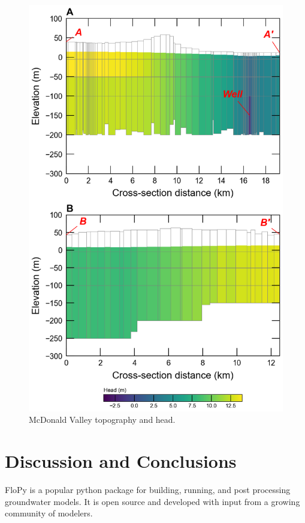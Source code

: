 \documentclass[11pt, oneside]{article}   	%
\begin{document}
\lipsum[2-4]

\begin{figure}[ht!]
	\begin{center}
		\includegraphics{figures/mv_voronoi_xsection.png}
	\end{center}
	\caption{McDonald Valley topography and head.}
	\label{fig:mvxsection}
\end{figure}

\lipsum[2-4]

\section{Discussion and Conclusions}
FloPy is a popular python package for building, running, and post processing groundwater models.  It is open source and developed with input from a growing community of modelers.  
\end{document}
